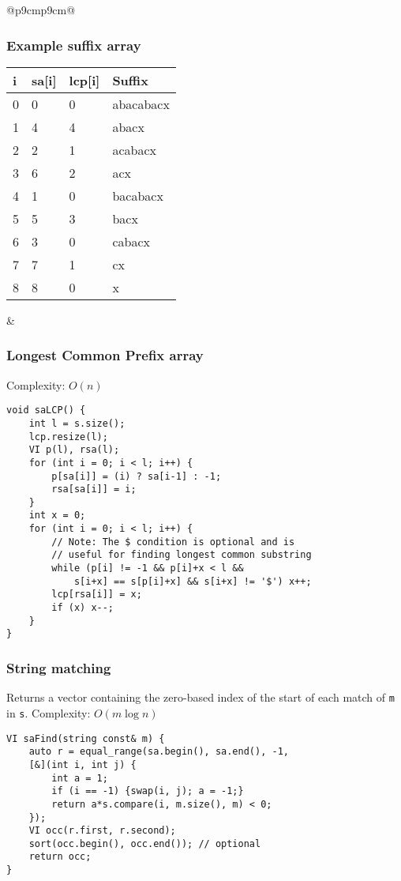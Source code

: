 \documentclass[letterpaper]{article}
\begin{document}
\begin{tabular}{@{}p{9cm}p{9cm}@{}}
\subsubsection{Example suffix array}

{
\fontfamily{\ttdefault}\selectfont
\begin{tabular}{llll}
i & sa[i] & lcp[i] & Suffix\\ \hline
0 & 0 & 0 & abacabacx\\
1 & 4 & 4 & abacx\\
2 & 2 & 1 & acabacx\\
3 & 6 & 2 & acx\\
4 & 1 & 0 & bacabacx\\
5 & 5 & 3 & bacx\\
6 & 3 & 0 & cabacx\\
7 & 7 & 1 & cx\\
8 & 8 & 0 & x\\
\end{tabular}
}
&
\subsubsection{Longest Common Prefix array}

Complexity: $O\left(n\right)$

\begin{lstlisting}
void saLCP() {
	int l = s.size();
	lcp.resize(l);
	VI p(l), rsa(l);
	for (int i = 0; i < l; i++) {
		p[sa[i]] = (i) ? sa[i-1] : -1;
		rsa[sa[i]] = i;
	}
	int x = 0;
	for (int i = 0; i < l; i++) {
		// Note: The $ condition is optional and is
		// useful for finding longest common substring
		while (p[i] != -1 && p[i]+x < l &&
			s[i+x] == s[p[i]+x] && s[i+x] != '$') x++;
		lcp[rsa[i]] = x;
		if (x) x--;
	}
}
\end{lstlisting}

\subsubsection{String matching}

Returns a vector containing the zero-based index of the start of each match of \texttt{m} in \texttt{s}. Complexity: $O\left(m\log n\right)$

\begin{lstlisting}
VI saFind(string const& m) {
	auto r = equal_range(sa.begin(), sa.end(), -1,
	[&](int i, int j) {
		int a = 1;
		if (i == -1) {swap(i, j); a = -1;}
		return a*s.compare(i, m.size(), m) < 0;
	});
	VI occ(r.first, r.second);
	sort(occ.begin(), occ.end()); // optional
	return occ;
}
\end{lstlisting}

\end{tabular}
\end{document}
